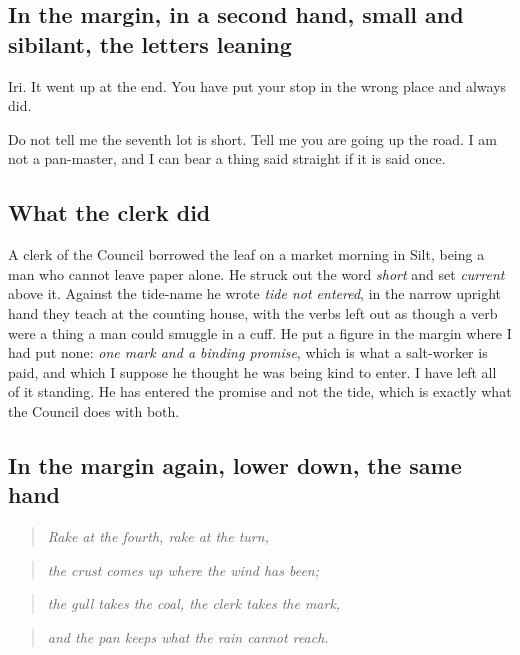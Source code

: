\documentclass{design/chronicle}
\begin{document}
\subsection*{In the margin, in a second hand, small and sibilant, the letters leaning}

Iri. It went up at the end. You have put your stop in the wrong place and always did.

Do not tell me the seventh lot is short. Tell me you are going up the road. I am not a pan-master, and I can bear a thing said straight if it is said once.

\subsection*{What the clerk did}

A clerk of the Council borrowed the leaf on a market morning in Silt, being a man who cannot leave paper alone. He struck out the word \emph{short} and set \emph{current} above it. Against the tide-name he wrote \emph{tide not entered}, in the narrow upright hand they teach at the counting house, with the verbs left out as though a verb were a thing a man could smuggle in a cuff. He put a figure in the margin where I had put none: \emph{one mark and a binding promise}, which is what a salt-worker is paid, and which I suppose he thought he was being kind to enter. I have left all of it standing. He has entered the promise and not the tide, which is exactly what the Council does with both.

\subsection*{In the margin again, lower down, the same hand}

\begin{quote}\itshape Rake at the fourth, rake at the turn,\end{quote}

\begin{quote}\itshape the crust comes up where the wind has been;\end{quote}

\begin{quote}\itshape the gull takes the coal, the clerk takes the mark,\end{quote}

\begin{quote}\itshape and the pan keeps what the rain cannot reach.\end{quote}
\end{document}
